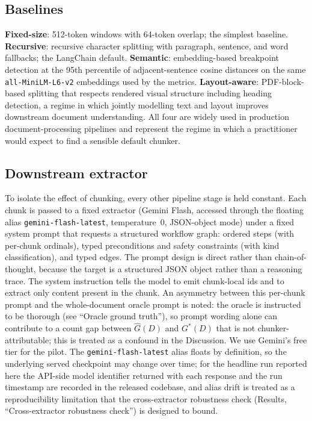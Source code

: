 \documentclass[fleqn,10pt]{wlscirep}
\begin{document}
\subsection*{Baselines}

\textbf{Fixed-size}: 512-token windows with 64-token overlap; the
simplest baseline. \textbf{Recursive}: recursive character splitting
with paragraph, sentence, and word fallbacks; the LangChain default.
\textbf{Semantic}: embedding-based breakpoint detection at the 95th
percentile of adjacent-sentence cosine distances on the same
\texttt{all-MiniLM-L6-v2} embeddings used by the metrics.
\textbf{Layout-aware}: PDF-block-based splitting that respects rendered
visual structure including heading detection, a regime in which jointly
modelling text and layout improves downstream document
understanding\cite{xu2020layoutlm,blecher2023nougat}. All four are
widely used in production document-processing pipelines and represent the regime
in which a practitioner would expect to find a sensible default
chunker.

\subsection*{Downstream extractor}

To isolate the effect of chunking, every other pipeline stage is held
constant. Each chunk is passed to a fixed extractor (Gemini Flash,
accessed through the floating alias \texttt{gemini-flash-latest},
temperature~0, JSON-object mode) under a fixed system prompt that
requests a structured workflow graph: ordered steps (with per-chunk
ordinals), typed preconditions and safety constraints (with kind
classification), and typed edges. The prompt design is direct rather
than chain-of-thought, because the target is a structured JSON object
rather than a reasoning trace\cite{wei2022cot}. The system instruction
tells the model to emit chunk-local ids and to extract only content
present in the chunk. An asymmetry between this per-chunk prompt and
the whole-document oracle prompt is noted: the oracle is instructed
to be thorough (see ``Oracle ground truth''), so prompt wording alone
can contribute to a count gap between $\hat{G}(D)$ and $G^{*}(D)$ that
is not chunker-attributable; this is treated as a confound in the
Discussion. We use Gemini's free tier for the pilot. The
\texttt{gemini-flash-latest} alias floats by definition, so the
underlying served checkpoint may change over time; for the headline
run reported here the API-side model identifier returned with each
response and the run timestamp are recorded in the released codebase,
and alias drift is treated as a reproducibility limitation that the
cross-extractor robustness check (Results, ``Cross-extractor
robustness check'') is designed to bound.
\end{document}
